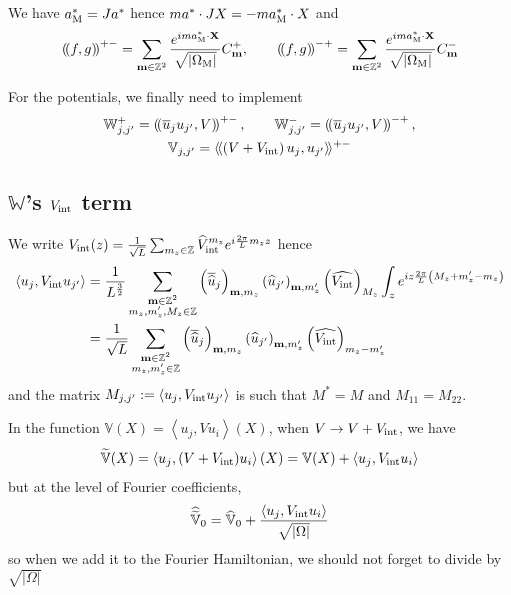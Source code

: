 \documentclass[11pt,a4paper,reqno,french,tikz]{amsart}
\newcommand{\pa}[1]{\left( #1 \right)} %
\newcommand{\ab}[1]{\left|#1\right|} %
\newcommand{\ps}[1]{\left< #1 \right>} %
\newcommand{\f}[2]{\frac{#1}{#2}} %
\newcommand{\ind}[1]{_{\textup{#1}}} %
\newcommand{\bbV}{\mathbb{V}}
\newcommand{\db}[1]{\left(\!\left( #1 \right)\!\right)}
\def\bX{{\mathbf X}}
\def\bmm{{\mathbf m}}
\def\bbV{{\mathbb V}}
\def\bbW{{\mathbb W}}
\newcommand{\sqom}{\sqrt{\ab{\Omega\ind{M}}}}
\def\lAngle{\langle\!\langle}
\def\rAngle{\rangle\!\rangle}
\begin{document}
We have $a^*\ind{M} = J a^*$ hence $ma^* \cdot JX = -m a\ind{M}^* \cdot X$ and
\begin{align*}
\db{f,g}^{+-} = \sum_{\bmm \in \Z^2} \f{e^{ima^*\ind{M} \cdot \bX}}{\sqom} C_{\bmm}^+, \qquad \db{f,g}^{-+} = \sum_{\bmm \in \Z^2} \f{e^{ima^*\ind{M} \cdot \bX}}{\sqom} C_{\bmm}^-
\end{align*}



For the potentials, we finally need to implement
\begin{multline*}
\bbW_{j,j'}^+ = \db{\overline{u}_j u_{j'}, V}^{+-}, \qquad \bbW_{j,j'}^- = \db{\overline{u}_j u_{j'}, V}^{-+},\\
\bbV_{j,j'} = \lAngle \pa{V+V\ind{int}} u_j , u_{j'} \rAngle^{+-}
\end{multline*}




\subsection{$\bbW$'s $V\ind{int}$ term}%
\label{sub:_bbw_s_vint_term}
We write $V\ind{int}(z) = \f{1}{\sqrt{L}} \sum_{m_z \in \Z} \widehat{V}\ind{int}^{m_z} e^{i \f{2\pi}L m_z z}$ hence
\begin{align*}
	\ps{u_j, V\ind{int} u_{j'}} &= \f{1}{L^{\f 32}} \sum_{\substack{\bmm \in \Z^2 \\ m_z,m_z',M_z \in \Z}} \pa{\overline{\widehat{u}}_j}_{\bmm,m_z} \pa{\widehat{u}_{j'}}_{\bmm,m_z'}\pa{\widehat{V\ind{int}}}_{M_z} \int_z e^{iz \f{2\pi}{L} \pa{M_z + m_z'-m_z}} \\
& = \f{1}{\sqrt{L}} \sum_{\substack{\bmm \in \Z^2 \\ m_z,m_z' \in \Z}} \pa{\overline{\widehat{u}}_j}_{\bmm,m_z} \pa{\widehat{u}_{j'}}_{\bmm,m_z'}\pa{\widehat{V\ind{int}}}_{m_z-m_z'} 
\end{align*}
and the matrix $M_{j,j'} := \ps{u_j, V\ind{int} u_{j'}}$ is such that $M^* = M$ and $M_{11} = M_{22}$.

In the function $\bbV(X) = \ps{u_j,V u_i}(X)$, when $V \rightarrow V+ V\ind{int}$, we have 
\begin{align*}
\widetilde{\bbV}(X) = \ps{u_j,(V+V\ind{int}) u_i}(X) = \bbV(X) + \ps{u_j,V\ind{int} u_i}
\end{align*}
but at the level of Fourier coefficients,
\begin{align*}
\widehat{\widetilde{\bbV}}_0 = \widehat{\bbV}_0 + \f{\ps{u_j,V\ind{int} u_i}}{\sqrt{\ab{\Omega}}}
\end{align*}
so when we add it to the Fourier Hamiltonian, we should not forget to divide by $\sqrt{\ab{\Omega}}$
\end{document}
